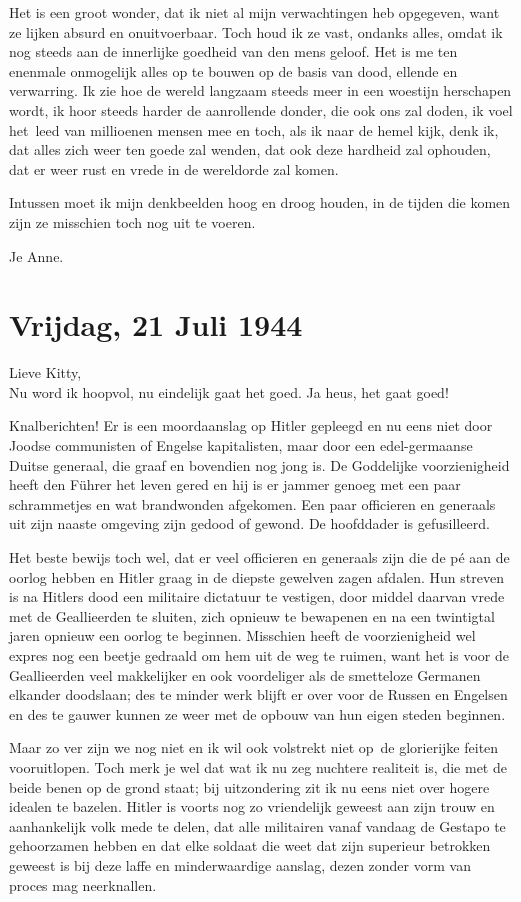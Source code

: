 \documentclass{book}
\begin{document}
Het is een groot wonder, dat ik niet al mijn verwachtingen heb opgegeven, want
ze lijken absurd en onuitvoerbaar. Toch houd ik ze vast, ondanks alles, omdat ik
nog steeds aan de innerlijke goedheid van den mens geloof. Het is me ten
enenmale onmogelijk alles op te bouwen op de basis van dood, ellende en
verwarring. Ik zie hoe de wereld langzaam steeds meer in een woestijn herschapen
wordt, ik hoor steeds harder de aanrollende donder, die ook ons zal doden, ik
voel het~leed van millioenen mensen mee en toch, als ik naar de hemel kijk, denk
ik, dat alles zich weer ten goede zal wenden, dat ook deze hardheid zal
ophouden, dat er weer rust en vrede in de wereldorde zal komen.

Intussen moet ik mijn denkbeelden hoog en droog houden, in de tijden die komen
zijn ze misschien toch nog uit te voeren.

Je Anne.

\section*{Vrijdag, 21 Juli 1944}

Lieve Kitty,\\
Nu word ik hoopvol, nu eindelijk gaat het goed. Ja heus, het gaat
goed!

Knalberichten! Er is een moordaanslag op Hitler gepleegd en nu eens niet door
Joodse communisten of Engelse kapitalisten, maar door een edel-germaanse Duitse
generaal, die graaf en bovendien nog jong is. De Goddelijke voorzienigheid heeft
den Führer het leven gered en hij is er jammer genoeg met een paar schrammetjes
en wat brandwonden afgekomen.  Een paar officieren en generaals uit zijn naaste
omgeving zijn gedood of gewond. De hoofddader is gefusilleerd.

Het beste bewijs toch wel, dat er veel officieren en generaals zijn die de pé
aan de oorlog hebben en Hitler graag in de diepste gewelven zagen afdalen. Hun
streven is na Hitlers dood een militaire dictatuur te vestigen, door middel
daarvan vrede met de Geallieerden te sluiten, zich opnieuw te bewapenen en na
een twintigtal jaren opnieuw een oorlog te beginnen. Misschien heeft de
voorzienigheid wel expres nog een beetje gedraald om hem uit de weg te ruimen,
want het is voor de Geallieerden veel makkelijker en ook voordeliger als de
smetteloze Germanen elkander doodslaan; des te minder werk blijft er over voor
de Russen en Engelsen en des te gauwer kunnen ze weer met de opbouw van hun
eigen steden beginnen.

Maar zo ver zijn we nog niet en ik wil ook volstrekt niet op~de glorierijke
feiten vooruitlopen. Toch merk je wel dat wat ik nu zeg nuchtere realiteit is,
die met de beide benen op de grond staat; bij uitzondering zit ik nu eens niet
over hogere idealen te bazelen. Hitler is voorts nog zo vriendelijk geweest aan
zijn trouw en aanhankelijk volk mede te delen, dat alle militairen vanaf vandaag
de Gestapo te gehoorzamen hebben en dat elke soldaat die weet dat zijn superieur
betrokken geweest is bij deze laffe en minderwaardige aanslag, dezen zonder vorm
van proces mag neerknallen.
\end{document}
